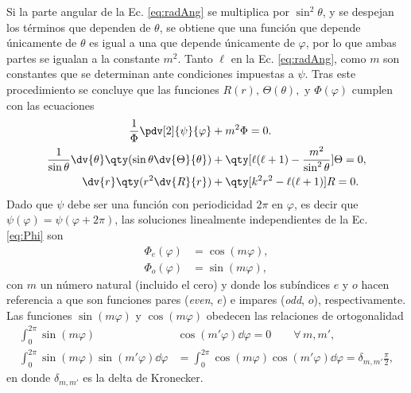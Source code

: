 %
Si la parte angular de la Ec. \eqref{eq:radAng} se multiplica por $\sin^2\theta$, y se despejan los términos que dependen de $\theta$, se obtiene que una función que depende únicamente de $\theta$ es igual a una que depende únicamente de $\varphi$, por lo que ambas partes se igualan a la constante $m^2$. Tanto $\ell$ en la Ec. \eqref{eq:radAng}, como $m$ son constantes que se determinan ante condiciones impuestas a $\psi$. Tras este procedimiento se concluye que las funciones $R(r),\, \Theta(\theta), \mbox{ y } \Phi(\varphi)$ cumplen con las ecuaciones
%
	\begin{align}
	\frac{1}{\Phi}\pdv[2]{\psi}{\varphi} &+ m^2 \Phi =0. \label{eq:Phi}\\
	\frac{1}{\sin\theta}\dv{\theta}\qty(\sin\theta\dv{\Theta}{\theta}) &+ \qty[\ell(\ell+1)- \frac{m^2}{\sin^2\theta}]\Theta =0,\label{eq:Theta}\\
	\dv{r}\qty(r^2\dv{R}{r}) &+ \qty[ k^2 r^2 - \ell (\ell +1)] R =0. \label{eq:Req}
	\end{align}	
%	
Dado que $\psi$ debe ser una función con periodicidad $2\pi$ en $\varphi$, es decir que $\psi(\varphi) = \psi(\varphi+2\pi)$, las soluciones linealmente independientes de la Ec. \eqref{eq:Phi} son 
%
	\begin{align}
	\Phi_e(\varphi) &= \cos(m\varphi),\label{eq:Cos}\\
	\Phi_o(\varphi) &= \sin(m\varphi),\label{eq:Sin}
	\end{align}
%
con $m$ un número natural (incluido el cero) y donde los subíndices $e$ y $o$ hacen referencia a que son funciones pares (\emph{even}, $e$) e impares (\emph{odd}, $o$), respectivamente. Las funciones $\sin(m\varphi)$ y $\cos(m\varphi)$ obedecen las relaciones de ortogonalidad
%
	\begin{align}
	\int_0^{2\pi} \sin(m\varphi) &\cos(m' \varphi) \dd\varphi = 0 \qquad \forall\, m,m',\label{seq:ortSinCos}\\
	\int_0^{2\pi} \sin(m\varphi) \sin(m'\varphi)\dd\varphi &=  \int_0^{2\pi} \cos(m\varphi) \cos(m'\varphi)\dd\varphi  = \delta_{m,m'}\frac{\pi}{2},\label{seq:ortCos2}
	\end{align}
%	
en donde $\delta_{m,m'}$ es la delta de Kronecker.

